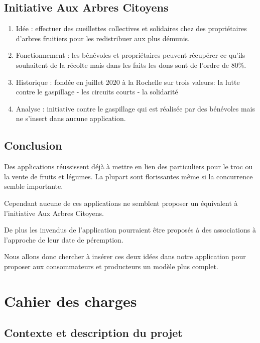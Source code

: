 \documentclass{article}
\begin{document}
\subsection{Initiative Aux Arbres Citoyens}
\begin{enumerate}
    \item Idée : effectuer des cueillettes collectives et solidaires
    chez des propriétaires d'arbres fruitiers pour les redistribuer
    aux plus démunis.
    \item Fonctionnement : les bénévoles et propriétaires peuvent récupérer
    ce qu'ils souhaitent de la récolte mais dans les faits les dons sont
    de l'ordre de 80\%.
    \item Historique : fondée en juillet 2020 à la Rochelle sur trois
    valeurs: la lutte contre le gaspillage
             - les circuits courts
             - la solidarité
    \item Analyse : initiative contre le gaspillage qui est réalisée par
    des bénévoles mais ne s'insert dans aucune application.
\end{enumerate}

\subsection{Conclusion}

Des applications réussissent déjà à mettre en lien des particuliers pour
le troc ou la vente de fruits et légumes. La plupart sont florissantes même 
si la concurrence semble importante.

Cependant aucune de ces applications ne semblent proposer un équivalent à l'initiative Aux Arbres Citoyens.


De plus les invendus de l'application pourraient être proposés à des 
associations à l'approche de leur date de péremption.


Nous allons donc chercher à insérer ces deux idées dans notre application
pour proposer aux consommateurs et producteurs un modèle plus complet.

\vspace{8mm}

\section{Cahier des charges}

\subsection{Contexte et description du projet}
\end{document}
